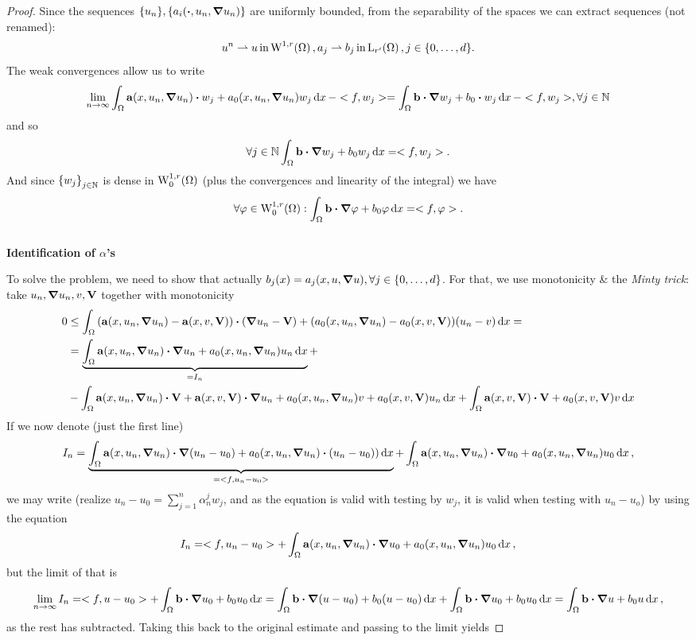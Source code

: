 \documentclass{article}
\begin{document}
\begin{proof}
	Since the sequences $\qty{u_n}, \qty{a_i\qty(\vdot, u_n, \grad u_n)}$ are uniformly bounded, from the separability of the spaces we can extract sequences (not renamed):
	\[
		u^n \rightharpoonup u \, \text{in} \, \WkpSet[1][r]{\Omega}, a_j \rightharpoonup b_j \, \text{in} \, \LpSet[r']{\Omega}, j \in  \qty{0, \dots, d}.
	\]
	The weak convergences allow us to write
	\[
		\lim_{n \to \infty}\int_{\Omega}\vb{a}\qty(x, u_n, \grad u_n) \vdot w_j + a_0\qty(x, u_n, \grad u_n) w_j\dd{x} - <f,w_j> = \int_{\Omega}\vb{b} \vdot \grad w_j + b_0 \vdot w_j\dd{x} -<f,w_j>, \forall j \in \N
	\]
	and so
	\[
		\forall j \in \N \int_{\Omega}\vb{b} \vdot \grad w_j + b_0 w_j\dd{x} = <f,w_j>.
	\]
	And since $\qty{w_j}_{j \in {\mathbb N}}$ is dense in $\WkpzeroSet[1][r]{\Omega}$ (plus the convergences and linearity of the integral) we have
	\[
		\forall \varphi \in \WkpzeroSet[1][r]{\Omega}: \int_{\Omega}\vb{b} \vdot \grad \varphi + b_0 \varphi\dd{x} = <f, \varphi>.
	\]
	\\

	\textbf{Identification of $\alpha$'s}

	To solve the problem, we need to show that actually $b_j(x) = a_j\qty(x, u, \grad u), \forall j \in \qty{0, \dots, d}$. For that, we use monotonicity \& the \textit{Minty trick}: take $u_n, \grad u_n, v, \vb{V}$ together with monotonicity
	\begin{align*}
		0& \leq \int_{\Omega}\qty(\vb{a}\qty(x, u_n, \grad u_n) - \vb{a}\qty(x, v, \vb{V}))\vdot\qty(\grad u_n - \vb{V}) + \qty(a_0\qty(x, u_n, \grad u_n) - a_0\qty(x, v, \vb{V}))\qty(u_n - v)\dd{x}  = \\
		 &= \underbrace{\int_{\Omega}\vb{a}\qty(x, u_n, \grad u_n) \vdot \grad u_n + a_0\qty(x, u_n, \grad u_n) u_n\dd{x}}_{= I_n} + \\
& - \int_{\Omega}\vb{a}\qty(x, u_n, \grad u_n) \vdot \vb{V} + \vb{a}\qty(x, v, \vb{V}) \vdot \grad u_n + a_0\qty(x, u_n, \grad u_n) v + a_0\qty(x, v, \vb{V})u_n\dd{x} + \int_{\Omega}\vb{a}\qty(x, v, \vb{V}) \vdot \vb{V} + a_0\qty(x, v, \vb{V})v\dd{x}
	\end{align*}
If we now denote (just the first line)
	\[
		I_n = \underbrace{\int_{\Omega}\vb{a}\qty(x, u_n, \grad u_n) \vdot \grad \qty(u_n-u_0)+ a_0\qty(x, u_n, \grad u_n)\vdot \qty(u_n - u_0))\dd{x}}_{= <f, u_n - u_0>} + \int_{\Omega}\vb{a}\qty(x, u_n, \grad u_n)\vdot \grad u_0 + a_0(x, u_n, \grad u_n)u_0\dd{x},
	\]
	we may write (realize $u_n - u_0 = \sum_{j=1}^n \alpha_n^j w_j$, and as the equation is valid with testing by $w_j$, it is valid when testing with $u_n - u_o$) by using the equation 
	\[
		I_n = <f, u_n - u_0> + \int_{\Omega}\vb{a}\qty(x, u_n, \grad u_n)\vdot \grad u_0 + a_0(x, u_n, \grad u_n)u_0\dd{x},
	\]
but the limit of that is
\[
	\lim_{n \to \infty}I_n = <f,u-u_0> + \int_{\Omega}\vb{b} \vdot \grad u_0 + b_0 u_0\dd{x} = \int_{\Omega}\vb{b} \vdot \grad (u - u_0) + b_0 \qty(u - u_0)\dd{x} + \int_{\Omega}\vb{b} \vdot \grad u_0 + b_0 u_0\dd{x} =  \int_{\Omega}\vb{b} \vdot \grad u + b_0 u\dd{x},
\]
	as the rest has subtracted. Taking this back to the original estimate and passing to the limit yields


\end{proof}
\end{document}
